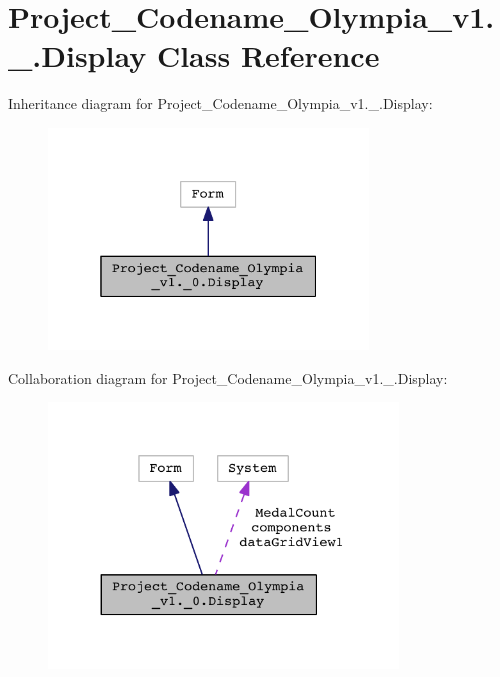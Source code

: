 \hypertarget{classProject__Codename__Olympia__v1_1_1__0_1_1Display}{}\section{Project\+\_\+\+Codename\+\_\+\+Olympia\+\_\+v1.\+\_.\+Display Class Reference}
\label{classProject__Codename__Olympia__v1_1_1__0_1_1Display}


Inheritance diagram for Project\+\_\+\+Codename\+\_\+\+Olympia\+\_\+v1.\+\_.\+Display\+:\nopagebreak
\begin{figure}[H]
\begin{center}
\leavevmode
\includegraphics[width=241pt]{classProject__Codename__Olympia__v1_1_1__0_1_1Display__inherit__graph}
\end{center}
\end{figure}


Collaboration diagram for Project\+\_\+\+Codename\+\_\+\+Olympia\+\_\+v1.\+\_.\+Display\+:\nopagebreak
\begin{figure}[H]
\begin{center}
\leavevmode
\includegraphics[width=263pt]{classProject__Codename__Olympia__v1_1_1__0_1_1Display__coll__graph}
\end{center}
\end{figure}
